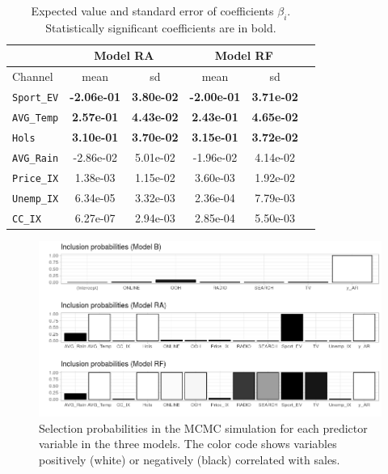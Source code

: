 \begin{table}[h]
\centering
\begin{tabular}{ |l|c|c|c|c|c| }
  \hline
  &  \multicolumn{2}{|c|}{Model RA} & \multicolumn{2}{|c|}{Model RF}\\
  \hline
  Channel & mean & sd & mean & sd\\
  \hline
  \texttt{Sport\_EV} & \textbf{-2.06e-01} & \textbf{3.80e-02} & \textbf{-2.00e-01} &\textbf{ 3.71e-02} \\
  \texttt{AVG\_Temp} &  \textbf{2.57e-01} & \textbf{4.43e-02} & \textbf{2.43e-01} & \textbf{4.65e-02}   \\
  \texttt{Hols} & \textbf{3.10e-01} &\textbf{ 3.70e-02}   & \textbf{3.15e-01} & \textbf{3.72e-02}  \\
  \texttt{AVG\_Rain} &  -2.86e-02 & 5.01e-02 & -1.96e-02 & 4.14e-02     \\
  \texttt{Price\_IX} &  1.38e-03 &  1.15e-02 & 3.60e-03 & 1.92e-02  \\
  \texttt{Unemp\_IX} &  6.34e-05 & 3.32e-03 & 2.36e-04 & 7.79e-03  \\
  \texttt{CC\_IX} & 6.27e-07 & 2.94e-03 & 2.85e-04 & 5.50e-03 \\
    \hline
\end{tabular} \caption{Expected value and standard error of coefficients $\beta_i$. Statistically significant coefficients are in bold.}\label{tab:11}
\end{table}



\begin{figure}[h]
\centering
\includegraphics[scale=0.6]{figures/inc_probas2.png}
\caption{Selection probabilities in the MCMC simulation for each predictor variable in the three models. The color code shows variables positively (white) or negatively (black) correlated with sales. }\label{fig:inc_probas}
\end{figure}

